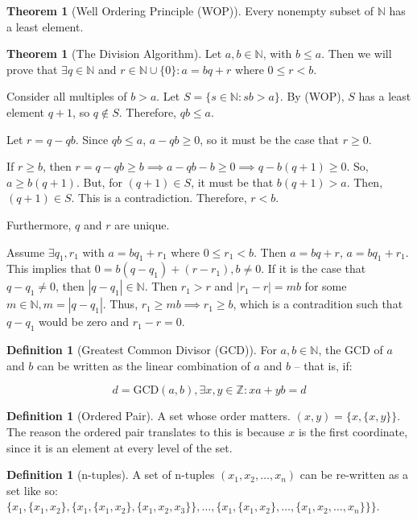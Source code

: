 \documentclass[10pt]{article}
\theoremstyle{definition}
\newtheorem{definition}[equation]{Definition}
\newtheorem{theorem}[equation]{Theorem}
\newcommand{\N}{\mathbb{N}}
\newcommand{\Z}{\mathbb{Z}}
\begin{document}
\begin{theorem}[Well Ordering Principle (WOP)]
  Every nonempty subset of $\N$ has a least element.
\end{theorem}

\begin{theorem}[The Division Algorithm]
  Let $a,b\in\N$, with $b\leq a$. Then we will prove that $\exists q\in \N$ and $r\in\N\cup\{0\}:a=bq+r$ where $0\leq r < b$.

  Consider all multiples of $b>a$. Let $S=\{s\in\N:sb>a\}$. By (WOP), $S$ has a least element $q+1$, so $q\not\in S$. Therefore, $qb\leq a$.

  Let $r=q-qb$. Since $qb\leq a$, $a-qb \geq 0$, so it must be the case that $r\geq 0$.

  If $r\geq b$, then $r=q-qb \geq b \implies a-qb-b \geq 0 \implies q-b(q+1) \geq 0$. So, $a\geq b(q+1)$. But, for $(q+1)\in S$, it must be that $b(q+1) > a$. Then, $(q+1)\in S$. This is a contradiction. Therefore, $r<b$.

  Furthermore, $q$ and $r$ are unique.

  Assume $\exists q_1,r_1$ with $a=bq_1 + r_1$ where $0\leq r_1 < b$. Then $a=bq+r$, $a=bq_1+r_1$. This implies that $0=b(q-q_1) + (r-r_1), b\neq 0$. If it is the case that $q-q_1\neq 0$, then $|q-q_1|\in\N$. Then $r_1 > r$ and $|r_1-r|=mb$ for some $m\in\N, m=|q-q_1|$. Thus, $r_1 \geq mb\implies r_1\geq b$, which is a contradition such that $q-q_1$ would be zero and $r_1-r=0$.
\end{theorem}

\begin{definition}[Greatest Common Divisor (GCD)]
  For $a,b\in\N$, the GCD of $a$ and $b$ can be written as the linear combination of $a$ and $b$ -- that is, if:

  $$d=\text{GCD}(a,b), \exists x,y\in\Z: xa+yb=d$$
\end{definition}

\begin{definition}[Ordered Pair]
  A set whose order matters. $(x,y) = \{x,\{x,y\}\}$.
  The reason the ordered pair translates to this is because $x$ is the first coordinate, since it is an element at every level of the set.
\end{definition}

\begin{definition}[n-tuples]
  A set of n-tuples $(x_1,x_2,\dots,x_n)$ can be re-written as a set like so: \\ $\{x_1,\{x_1,x_2\},\{x_1,\{x_1,x_2\},\{x_1,x_2,x_3\}\},\dots, \{x_1,\{x_1,x_2\},\dots, \{x_1,x_2,\dots, x_n\}\}\}$.
\end{definition}
\end{document}
